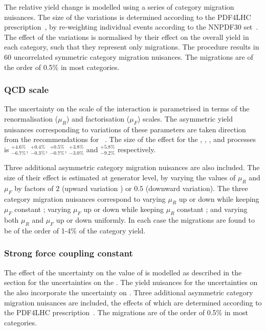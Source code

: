 The relative yield change is modelled using a series of category migration nuisances. The size of the variations is determined according to the PDF4LHC prescription~\cite{Demartin:2010er}, by re-weighting individual events according to the NNPDF30 \PDF set~\cite{Carrazza:2015aoa}. The effect of the variations is normalised by their effect on the overall yield in each category, such that they represent only migrations. The procedure results in 60 uncorrelated symmetric category migration nuisances. 
The migrations are of the order of 0.5\% in most categories.

\subsubsection{QCD scale}
The uncertainty on the scale of the \QCD interaction is parametrised in terms of the renormalisation ($\mu_{R}$) and factorisation ($\mu_{F}$) scales. The asymmetric yield nuisances corresponding to variations of these parameters are taken direction from the \LHCHXSWG recommendations for \crosssection\s~\cite{LHCHXSWGYR4}. The size of the effect for the \ggH, \VBF, \WH, \ZH and \ttH processes is $^{+4.6\%}_{-6.7\%}$, $^{+0.4\%}_{-0.3\%}$, $^{+0.5\%}_{-0.7\%}$, $^{+3.8\%}_{-3.0\%}$ and $^{+5.8\%}_{-9.2\%}$ respectively. 

Three additional asymmetric category migration nuisances are also included. The size of their effect is estimated at generator level, by varying the values of $\mu_{R}$ and $\mu_{F}$ by factors of $2$ (upward variation ) or $0.5$ (downward variation). The three category migration nuisances correspond to varying $\mu_{R}$ up or down while keeping $\mu_{F}$ constant ; varying $\mu_{F}$ up or down while keeping $\mu_{R}$ constant ; and varying both $\mu_{R}$ and $\mu_{F}$ up or down uniformly. In each case the migrations are found to be of the order of 1-4\% of the category yield.


\subsubsection{Strong force coupling constant}
The effect of the uncertainty on the value of \alphaS is modelled as described in the section for the uncertainties on the \PDF\s. The yield nuisances for the uncertainties on the \PDF\s also incorporate the uncertainty on \alphaS. Three additional asymmetric category migration nuisances are included, the effects of which are determined according to the PDF4LHC prescription~\cite{Demartin:2010er}.  
The migrations are of the order of 0.5\% in most categories.

